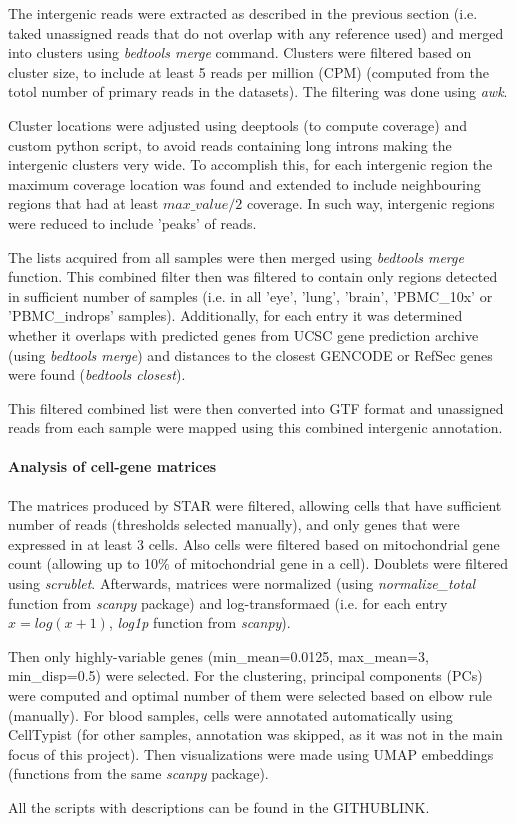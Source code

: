 The intergenic reads were extracted as described in the previous section (i.e. taked unassigned reads that do not overlap with any reference used)
and merged into clusters using \textit{bedtools merge} command.
Clusters were filtered based on cluster size, to include at least 5 reads per million (CPM)
(computed from the totol number of primary reads in the datasets).
The filtering was done using \textit{awk}.

Cluster locations were adjusted using deeptools (to compute coverage) and custom python script,
to avoid reads containing long introns making the intergenic clusters very wide.
To accomplish this, for each intergenic region the maximum coverage location was found and extended to include neighbouring regions that had
at least $max\_value / 2$ coverage.
In such way, intergenic regions were reduced to include 'peaks' of reads.

The lists acquired from all samples were then merged using \textit{bedtools merge} function.
This combined filter then was filtered to contain only regions detected in sufficient number of samples
(i.e. in all 'eye', 'lung', 'brain', 'PBMC\_10x' or 'PBMC\_indrops' samples).
Additionally, for each entry it was determined whether it overlaps with predicted genes from UCSC gene prediction archive
(using \textit{bedtools merge}) and distances to the closest GENCODE or RefSec genes were found (\textit{bedtools closest}).

This filtered combined list were then converted into GTF format and unassigned reads from each sample were mapped using this
combined intergenic annotation.

\paragraph{Analysis of cell-gene matrices}

The matrices produced by STAR were filtered, allowing cells that have sufficient number of reads (thresholds selected manually),
and only genes that were expressed in at least 3 cells.
Also cells were filtered based on mitochondrial gene count (allowing up to 10\% of mitochondrial gene in a cell).
Doublets were filtered using \textit{scrublet}.
Afterwards, matrices were normalized (using \textit{normalize\_total} function from \textit{scanpy} package) and log-transformaed
(i.e. for each entry $x = log(x+1)$, \textit{log1p} function from \textit{scanpy}).

Then only highly-variable genes (min\_mean=0.0125, max\_mean=3, min\_disp=0.5) were selected.
For the clustering, principal components (PCs) were computed and optimal number of them were selected based on elbow rule (manually).
For blood samples, cells were annotated automatically using CellTypist
(for other samples, annotation was skipped, as it was not in the main focus of this project).
Then visualizations were made using UMAP embeddings (functions from the same \textit{scanpy} package).

All the scripts with descriptions can be found in the GITHUBLINK.
